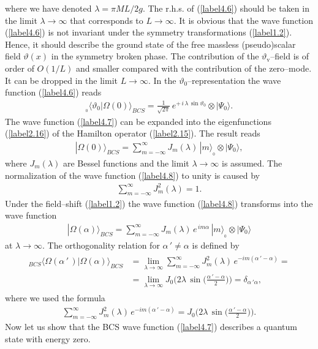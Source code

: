\documentclass[a4paper,12pt] {article}
\begin{document}
%
where we have denoted $\lambda = \pi M L/2g$. The r.h.s. of
(\ref{label4.6}) should be taken in the limit $\lambda \to \infty$
that corresponds to $L \to \infty$. It is obvious that the wave
function (\ref{label4.6}) is not invariant under the symmetry
transformations (\ref{label1.2}). Hence, it should describe the ground
state of the free massless (pseudo)scalar field $\vartheta(x)$ in the
symmetry broken phase. The contribution of the $\vartheta_{\mathrm v}$--field is of
order of $O(1/L)$ and smaller compared with the contribution of the
zero--mode. It can be dropped in the limit $L \to \infty$.  In the
$\vartheta_0$--representation the wave function (\ref{label4.6})
reads
%
\begin{eqnarray}\label{label4.7}
{_{_0}\langle \vartheta_0|\Omega(0)\rangle_{BCS}} =
\frac{1}{\sqrt{2\pi}}\,e^{\textstyle
+\,i\,\lambda\,\sin\vartheta_0}\otimes |\Psi_0\rangle.
\end{eqnarray}
%
The wave function (\ref{label4.7}) can be expanded into the
eigenfunctions (\ref{label2.16}) of the Hamilton operator
(\ref{label2.15}). The result reads
%
\begin{eqnarray}\label{label4.8}
|\Omega(0)\rangle_{BCS} = \sum^{\infty}_{m = -
\infty}J_m(\lambda)\,|m\rangle_{_0}\otimes |\Psi_0\rangle,
\end{eqnarray}
%
where $J_m(\lambda)$ are Bessel functions \cite{AS72} and the limit
$\lambda \to \infty$ is assumed. The normalization of the wave
function (\ref{label4.8}) to unity is caused by \cite{GR65}
%
\begin{eqnarray}\label{label4.9}
\sum^{\infty}_{m = - \infty}J^2_m(\lambda) = 1.
\end{eqnarray}
%
Under the field--shift (\ref{label1.2}) the wave function
(\ref{label4.8}) transforms into the wave function
%
\begin{eqnarray}\label{label4.10}
|\Omega(\alpha)\rangle_{BCS} = \sum^{\infty}_{m = -
\infty}J_m(\lambda)\,e^{\textstyle \,i m\alpha}\,|m\rangle_{_0}\otimes
|\Psi_0\rangle
\end{eqnarray}
%
at $\lambda \to \infty$.  The orthogonality relation for
$\alpha\,'\neq \alpha$ is defined by
%
\begin{eqnarray}\label{label4.11}
\begin{aligned}
_{BCS}\langle\Omega(\alpha\,'\,)|\Omega(\alpha)\rangle_{BCS} 
&= \lim_{\lambda \to \infty}\sum^{\infty}_{m 
= -\infty}J^2_m(\lambda)\,e^{\textstyle - im(\alpha\,' - \alpha)}=\\
&= \lim_{\lambda \to
\infty}J_0\Big(2\lambda\,\sin\Big(\frac{\alpha\,' -
\alpha}{2}\Big)\Big) = \delta_{\alpha\,'\alpha},
\end{aligned}
\end{eqnarray}
%
where we used the formula \cite{th0210104b}
%
\begin{eqnarray}\label{label4.12}
\sum^{\infty}_{m = - \infty}J^2_m(\lambda)\,e^{\textstyle -
im(\alpha\,' - \alpha)} = J_0\Big(2\lambda\,\sin\Big(\frac{\alpha\,' -
\alpha}{2}\Big)\Big).
\end{eqnarray}
%
Now let us show that the BCS wave function (\ref{label4.7}) describes
a quantum state with energy zero.
\end{document}
